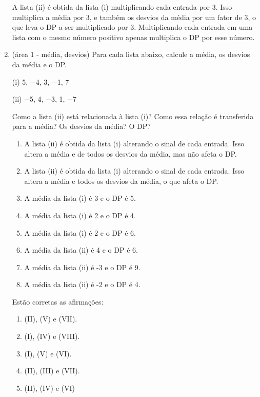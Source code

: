 \documentclass[12pt]{article}\documentclass[brazilian,12pt,a4paper,final]{article}
\begin{document}
\begin{enumerate}
A lista (ii) é obtida da lista (i) multiplicando cada entrada por 3. Isso multiplica a média por 3, e também os desvios da média por um
fator de 3, o que leva o DP a ser multiplicado por 3. Multiplicando cada entrada em
uma lista com o mesmo número positivo apenas multiplica o DP por esse número.

\item (área 1 - média, desvios) Para cada lista abaixo, calcule a média, os desvios da média e o DP.

(i) 5, −4, 3, −1, 7

(ii) −5, 4, −3, 1, −7

Como a lista (ii) está relacionada à lista (i)? Como essa relação é transferida para a
média? Os desvios da média? O DP?

\begin{enumerate}[label=(\Roman*)]

\item A lista (ii) é obtida da lista (i) alterando o sinal de cada entrada. Isso
altera a média e de todos os desvios da média, mas não afeta o DP.

\item A lista (ii) é obtida da lista (i) alterando o sinal de cada entrada. Isso
altera a média e todos os desvios da média, o que afeta o DP.

\item A média da lista (i) é 3 e o DP é 5.

\item A média da lista (i) é 2 e o DP é 4.

\item A média da lista (i) é 2 e o DP é 6.

\item A média da lista (ii) é 4 e o DP é 6.

\item A média da lista (ii) é -3 e o DP é 9.

\item A média da lista (ii) é -2 e o DP é 4.
\end{enumerate}

Estão corretas as afirmações:

\begin{enumerate}
    \item (II), (V) e (VII).
    \item (I), (IV) e (VIII).
    \item (I), (V) e (VI). 
    \item (II), (III) e (VII).
    \item (II), (IV) e (VI)
\end{enumerate}


\end{enumerate}
\end{document}
